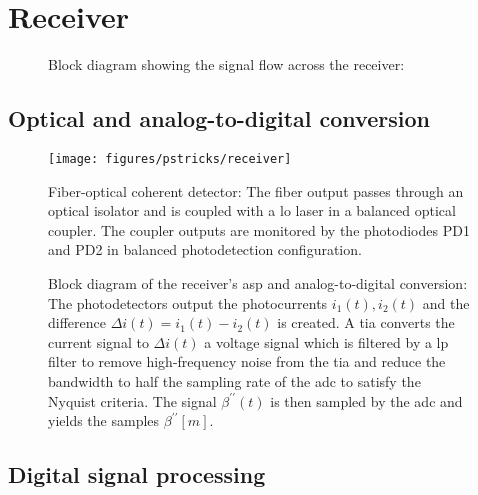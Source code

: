 \section{Receiver}


\begin{figure}[htb]
	\centering
	
	\caption{Block diagram showing the signal flow across the receiver: }\label{fig:receiver}
\end{figure}

\subsection{Optical and analog-to-digital conversion}

\begin{figure}[htb]
	\centering
	\texttt{[image: figures/pstricks/receiver]}
	\caption{Fiber-optical coherent detector: The fiber output passes through an optical isolator and is coupled with a \gls{lo} laser in a balanced optical coupler. The coupler outputs are monitored by the photodiodes PD1 and PD2 in balanced photodetection configuration.}
\end{figure}

\begin{figure}[htb]
	\centering
	
	\caption{Block diagram of the receiver's \gls{asp} and analog-to-digital conversion: The photodetectors output the photocurrents $i_1(t),i_2(t)$ and the difference $\Delta i(t)=i_1(t)-i_2(t)$ is created. A \gls{tia} converts the current signal to $\Delta i(t)$ a voltage signal which is filtered by a \gls{lp} filter to remove high-frequency noise from the \gls{tia} and reduce the bandwidth to half the sampling rate of the \gls{adc} to satisfy the Nyquist criteria. The signal $\beta^{\prime\prime}(t)$ is then sampled by the \gls{adc} and yields the samples $\beta^{\prime\prime}[m]$.}
\end{figure}

\FloatBarrier
\subsection{Digital signal processing}


